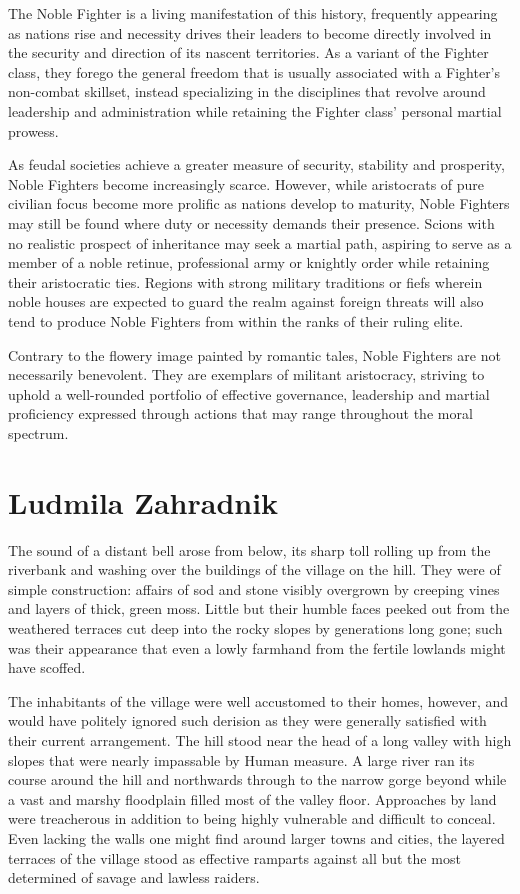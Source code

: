 The Noble Fighter is a living manifestation of this history, frequently appearing as nations rise and necessity drives their leaders to become directly involved in the security and direction of its nascent territories. As a variant of the Fighter class, they forego the general freedom that is usually associated with a Fighter’s non-combat skillset, instead specializing in the disciplines that revolve around leadership and administration while retaining the Fighter class’ personal martial prowess.

As feudal societies achieve a greater measure of security, stability and prosperity, Noble Fighters become increasingly scarce. However, while aristocrats of pure civilian focus become more prolific as nations develop to maturity, Noble Fighters may still be found where duty or necessity demands their presence. Scions with no realistic prospect of inheritance may seek a martial path, aspiring to serve as a member of a noble retinue, professional army or knightly order while retaining their aristocratic ties. Regions with strong military traditions or fiefs wherein noble houses are expected to guard the realm against foreign threats will also tend to produce Noble Fighters from within the ranks of their ruling elite.

Contrary to the flowery image painted by romantic tales, Noble Fighters are not necessarily benevolent. They are exemplars of militant aristocracy, striving to uphold a well-rounded portfolio of effective governance, leadership and martial proficiency expressed through actions that may range throughout the moral spectrum.

\chapter{Ludmila Zahradnik}

The sound of a distant bell arose from below, its sharp toll rolling up from the riverbank and washing over the buildings of the village on the hill. They were of simple construction: affairs of sod and stone visibly overgrown by creeping vines and layers of thick, green moss. Little but their humble faces peeked out from the weathered terraces cut deep into the rocky slopes by generations long gone; such was their appearance that even a lowly farmhand from the fertile lowlands might have scoffed.

 

The inhabitants of the village were well accustomed to their homes, however, and would have politely ignored such derision as they were generally satisfied with their current arrangement. The hill stood near the head of a long valley with high slopes that were nearly impassable by Human measure. A large river ran its course around the hill and northwards through to the narrow gorge beyond while a vast and marshy floodplain filled most of the valley floor. Approaches by land were treacherous in addition to being highly vulnerable and difficult to conceal. Even lacking the walls one might find around larger towns and cities, the layered terraces of the village stood as effective ramparts against all but the most determined of savage and lawless raiders.

